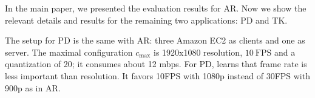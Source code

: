 \documentclass[twocolumn, 9pt]{article}
\begin{document}


In the main paper, we presented the evaluation results for AR. Now we show the
relevant details and results for the remaining two applications: PD and TK.

 The setup for PD is the same with AR: three Amazon
EC2 as clients and one as server. The maximal configuration $c_{\max}$ is
1920x1080 resolution, \(10~\text{FPS}\) and a quantization of 20; it consumes
about 12 mbps. For PD, \sysname{} learns that frame rate is less important than
resolution. It favors 10FPS with 1080p instead of 30FPS with 900p as in AR.
\end{document}
